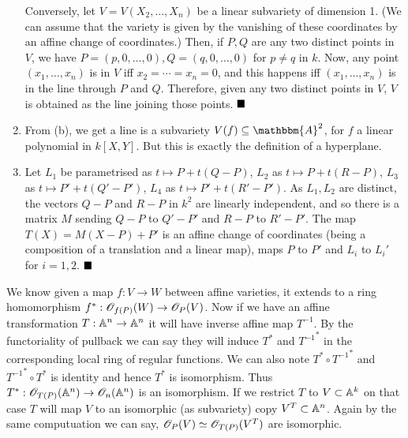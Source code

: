 \documentclass[12pt]{article}
\begin{document}
\begin{enumerate}[label = (\alph*)]
          Conversely, let \( V = V(X_2, \dots, X_n) \) be a linear subvariety of dimension 1. (We can assume that the variety is given by the vanishing of these coordinates by an affine change of coordinates.) Then, if \( P,Q \) are any two distinct points in \( V \), we have \( P = (p, 0, \dots, 0), Q = (q,0,\dots,0) \) for \( p \neq q \) in \( k \). Now, any point \( (x_1, \dots, x_n) \) is in \( V \) iff \( x_2 = \cdots = x_n = 0 \), and this happens iff \( (x_1, \dots, x_n) \) is in the line through \( P \) and \( Q \). Therefore, given any two distinct points in \( V \), \( V \) is obtained as the line joining those points. \(\hfill \blacksquare\)
          \smallskip

    \item From (b), we get a line is a subvariety \( V(f) \subseteq \mathbbm{A}^2 \), for \( f \) a linear polynomial in \( k[X,Y] \). But this is exactly the definition of a hyperplane.
          \smallskip

    \item Let \( L_1 \) be parametrised as \( t \mapsto P + t(Q-P) \), \( L_2 \) as \( t \mapsto P + t(R-P) \), \( L_3 \) as \( t \mapsto P' + t(Q'-P') \), \( L_4 \) as \( t \mapsto P' + t(R'-P')\). As \( L_1,L_2 \) are distinct, the vectors \( Q-P \) and \( R-P \) in \( k^2 \) are linearly independent, and so there is a matrix \( M \) sending \( Q-P \) to \( Q'-P' \) and \( R-P \) to \( R'-P' \). The map \( T(X) = M(X-P) + P' \) is an affine change of coordinates (being a composition of a translation and a linear map), maps \( P \) to \( P' \) and \( L_i \) to \( L_i' \) for \( i=1,2 \). \(\hfill \blacksquare\)
\end{enumerate}

\textcolor{maroon}{} We know given a map $f : V \to W$ between affine varieties, it extends to a ring homomorphism $f^{\ast}: \mathscr{O}_{f(P)}(W) \to \mathscr{O}_{P}(V)$. Now if we have an affine transformation $T : \mathbb{A}^n \to \mathbb{A}^n$ it will have inverse affine map $T^{-1}$. By the functoriality of pullback we can say they will induce $T^{\ast}$ and ${T^{-1}}^{\ast}$ in the corresponding local ring of regular functions. We can also note $T^{\ast} \circ {T^{-1}}^{\ast}$ and ${T^{-1}}^{\ast} \circ T^{\ast}$ is identity and hence $T^{\ast}$ is isomorphism. Thus $T^{\ast}: \mathscr{O}_{T(P)}(\mathbb{A}^n) \to \mathscr{O}_n(\mathbb{A}^n)$ is an isomorphism. If we restrict $T$ to $V \subset \mathbb{A}^k$ on that case $T$ will map $V$ to an isomorphic (as subvariety) copy $V^T\subset \mathbb{A}^n$. Again by the same computuation we can say, $\mathscr{O}_{P}(V) \simeq \mathscr{O}_{T(P)}(V^T)$ are isomorphic.
\end{document}
